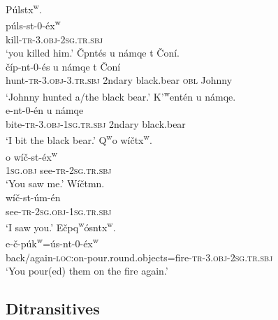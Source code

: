 \documentclass[output=paper,colorlinks,citecolor=brown]{langscibook}
\begin{document}
\ea
\label{ex-thomason-1}
\glll P\'ulstx\textsuperscript w.\\
      p\'uls-st-0-\'ex\textsuperscript w\\
      kill-\textsc{tr}-3.\textsc{obj}-\textsc{2sg}.\textsc{tr.sbj}\\
\glt `you killed him.'
\ex
\label{ex-thomason-2}
\v{C}{\textltilde}pnt\'es {\textltilde}u n\textltilde\'amqe t \v{C}on\'i.\\
\gll \v{c}\textltilde\'ip-nt-0-\'es  {\textltilde}u n\textltilde\'amqe t \v{C}on\'i\\
     hunt-\textsc{tr}-3.\textsc{obj}-3.\textsc{tr.sbj} 2ndary black.bear \textsc{obl} Johnny\\
\glt `Johnny hunted a/the black bear.'
\ex 
\label{ex-thomason-3}
{K'\textsuperscript w}e{\textglotstop}nt\'en {\textltilde}u n\textltilde\'amqe.\\
e\textglotstop-nt-0-\'en             {\textltilde}u  n\textltilde\'amqe\\
     bite-\textsc{tr}-3.\textsc{obj}-\textsc{1sg}.\textsc{tr.sbj} 2ndary          black.bear\\
\glt `I bit the black bear.'
\ex
\label{ex-thomason-4}
{Q\textsuperscript w}o w\'i\v{c}tx\textsuperscript w.\\
o w\'i\v{c}-st-\'ex\textsuperscript w\\
     \textsc{1sg}.\textsc{obj}       see-\textsc{tr}-\textsc{2sg}.\textsc{tr.sbj}\\  
\glt `You saw me.'
\ex 
\label{ex-thomason-5}
W\'i\v{c}tmn.\\
\gll w\'i\v{c}-st-\'um-\'en\\
     see-\textsc{tr}-\textsc{2sg}.\textsc{obj}-\textsc{1sg}.\textsc{tr.sbj}\\
\glt `I saw you.'
\ex
\label{ex-thomason-6}
E\textltilde\v{c}pq\textsuperscript w\'osntx\textsuperscript w.\\
\gll e\textltilde-\v{c}-p\'uk\textsuperscript w=\'us-nt-0-\'ex\textsuperscript w\\
     back/again-\textsc{loc:}on-pour.round.objects=fire-\textsc{tr}-3.\textsc{obj}-\textsc{2sg}.\textsc{tr.sbj}\\  
\glt `You pour(ed) them on the fire again.'
\z

\subsection{Ditransitives}   %
\label{thomason_section_2.2}
\end{document}
